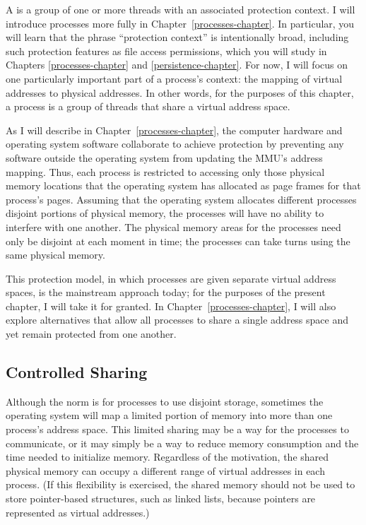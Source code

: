 A  is a group of one or more threads with an associated
protection context.  I will introduce processes more fully in
Chapter~\ref{processes-chapter}.  In
particular, you will learn that the phrase ``protection context'' is
intentionally broad, including such protection features as file access permissions,
which you will study in Chapters \ref{processes-chapter} and \ref{persistence-chapter}.  For now, I will focus on
one particularly important part of a process's context: the mapping
of virtual addresses to physical addresses.  In other words, for the
purposes of this chapter, a process is a group of threads that share a virtual
address space.

As I will describe in Chapter~\ref{processes-chapter}, the computer hardware and
operating system software collaborate to achieve protection by
preventing any software outside the operating system from updating the
MMU's address mapping.  Thus, each process is restricted to accessing
only those physical memory locations that the operating system
has allocated as page frames for that process's pages.  Assuming that
the operating system allocates different processes disjoint portions
of physical memory, the processes will have no ability to interfere with one
another.  The physical memory areas for the processes need only
be disjoint at each moment in time; the processes can take
turns using the same physical memory.

This protection model, in which processes are given separate virtual
address spaces, is the mainstream approach today; for the purposes of
the present chapter, I will take it for granted.  In Chapter~\ref{processes-chapter}, I will also explore alternatives that allow all processes to
share a single address space and yet remain protected from one
another.

\subsection{Controlled Sharing}
\label{controlled-sharing-subsection}
Although the norm is for processes to use disjoint storage, sometimes
the operating system will map a limited portion of memory into more
than one process's address space.  This limited sharing may be a way
for the processes to communicate, or it may simply be a way to reduce
memory consumption and the time needed to initialize memory.  Regardless of the motivation, the shared physical
memory can occupy a different range of virtual addresses in each
process.  (If this flexibility is exercised, the shared memory should
not be used to store pointer-based structures, such as linked lists,
because pointers are represented as virtual addresses.)

